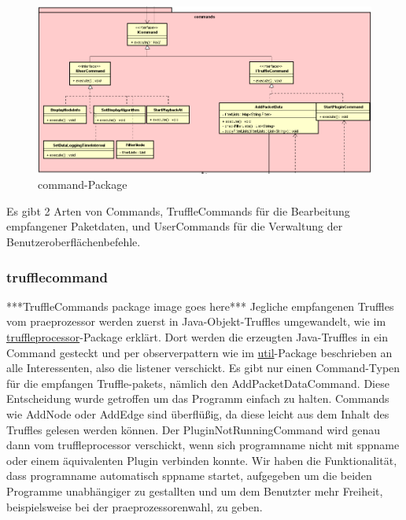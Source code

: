 \begin{figure}[H]
  \centering
  \includegraphics[width=\textwidth]{../diagramimages/commands.png}
  \caption{command-Package}
\end{figure}

Es gibt 2 Arten von Commands, TruffleCommands für die Bearbeitung empfangener
Paketdaten, und UserCommands für die Verwaltung der Benutzeroberflächenbefehle.

      \subsubsection{trufflecommand}
      \label{subsubsec:trufflecommand}
      ***TruffleCommands package image goes here***
      \newline
      \newline
      Jegliche empfangenen Truffles vom \gls{praeprozessor} werden zuerst in Java-Objekt-Truffles umgewandelt, wie
      im \hyperref[subsubsec:truffleprocessor]{truffleprocessor}-Package erklärt. Dort
      werden die erzeugten Java-Truffles in ein Command gesteckt und per \gls{observerpattern}
      wie im \hyperref[subsec:util]{util}-Package beschrieben an alle Interessenten, also die \gls{listener} verschickt.
      \newline
      \newline
      Es gibt nur einen Command-Typen für die empfangen Truffle-\glspl{paket}, nämlich den
      AddPacketDataCommand. Diese Entscheidung wurde getroffen um das Programm einfach
      zu halten. Commands wie AddNode oder AddEdge sind überflüßig, da diese leicht aus
      dem Inhalt des Truffles gelesen werden können.
      \newline
      \newline
      Der PluginNotRunningCommand wird genau dann vom truffleprocessor verschickt, wenn sich \gls{programname}
      nicht mit \gls{sppname} oder einem äquivalenten Plugin verbinden konnte. Wir
      haben die Funktionalität, dass \gls{programname} automatisch \gls{sppname} startet,
      aufgegeben um die beiden Programme unabhängiger zu gestallten und um dem Benutzter
      mehr Freiheit, beispielsweise bei der \gls{praeprozessor}enwahl, zu geben.

